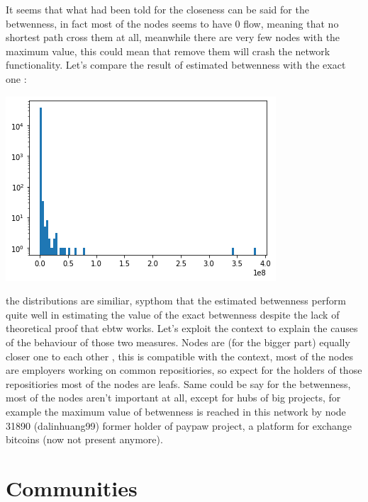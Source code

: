 \documentclass[]{article}
\begin{document}
    It seems that what had been told for the closeness can be said for the betwenness, in fact most of the nodes seems to have 0 flow, meaning that no shortest path cross them at all, meanwhile there are very few nodes with the maximum value, this could mean that remove them will crash the network functionality. Let's compare the result of estimated betwenness with the exact one :
    \begin{center}
        \includegraphics{charts/btw_dist.png}
    \end{center}
    the distributions are similiar, sypthom that the estimated betwenness perform quite well in estimating the value of the exact betwenness despite the lack of theoretical proof that ebtw works. Let's exploit the context to explain the causes of the behaviour of those two measures. Nodes are (for the bigger part) equally closer one to each other , this is compatible with the context, most of the nodes are employers working on common repositiories, so expect for the holders of those repositiories most of the nodes are leafs. Same could be say for the betwenness, most of the nodes aren't important at all, except for hubs of big projects, for example the maximum value of betwenness is reached in this network by node 31890 (dalinhuang99) former holder of paypaw project, a platform for exchange bitcoins (now not present anymore).

    \section*{Communities} 

    
\end{document}
